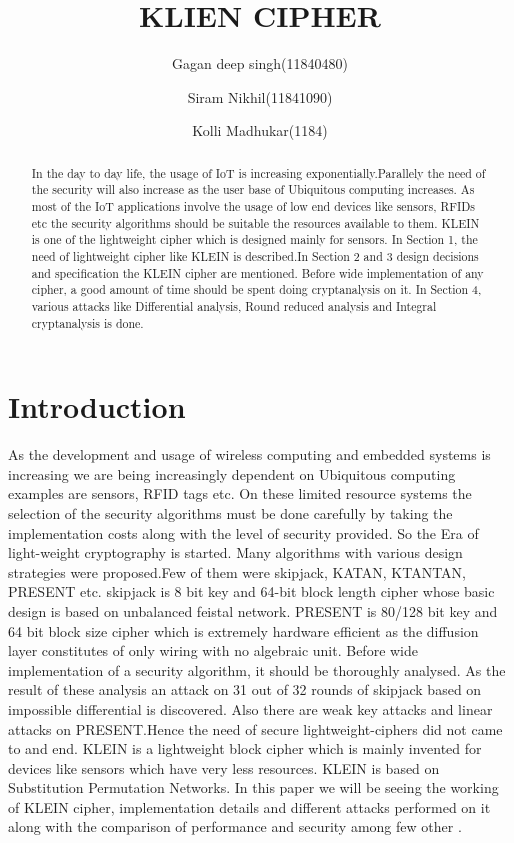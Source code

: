 \documentclass[preprint]{transcrypto}
\author{Gagan deep singh(11840480)\inst{1} \and Siram Nikhil\inst{1}(11841090) \and Kolli Madhukar(1184)\inst{1}}
\institute{
 Indian Institute of Technology, Bhilai, India 
}
\title{KLIEN CIPHER}
\begin{document}
\maketitle


\begin{abstract}
In the day to day life, the usage of IoT is increasing exponentially.Parallely the need of the security will also increase as the user base of Ubiquitous computing increases. As most of the IoT applications involve the usage of low end devices like sensors, RFIDs etc the security algorithms should be suitable the resources available to them. KLEIN is one of the lightweight cipher which is designed mainly for sensors. In Section 1, the need of lightweight cipher like KLEIN is described.In Section 2 and 3 design decisions and specification the KLEIN cipher are mentioned. Before wide implementation of any cipher, a good amount of time should be spent doing cryptanalysis on it. In Section 4, various attacks like Differential analysis, Round reduced analysis and Integral cryptanalysis is done.
\end{abstract}


\section{Introduction}
As the development and usage of wireless computing and embedded systems is increasing we are being increasingly dependent on Ubiquitous computing examples are sensors, RFID tags etc. On these limited resource systems the selection of the security algorithms must be done carefully by taking the implementation costs along with the level of security provided. So the Era of light-weight cryptography is started. Many algorithms with various design strategies were proposed.Few of them were skipjack, KATAN\cite{KATAN}, KTANTAN\cite{KATAN}, PRESENT\cite{PRESENT} etc. skipjack is 8 bit key and 64-bit block length cipher whose basic design is based on unbalanced feistal network. PRESENT is 80/128 bit key and 64 bit block size cipher  which is extremely hardware efficient as the diffusion layer constitutes of only wiring with no algebraic unit.
Before wide implementation of a security algorithm, it should be thoroughly analysed. As the result of these analysis an attack on 31 out of 32 rounds of skipjack based on impossible differential is discovered. Also there are weak key attacks and linear attacks on PRESENT.Hence the need of secure lightweight-ciphers did not came to and end. KLEIN is a lightweight block cipher which is mainly invented for devices like sensors which have very less resources. KLEIN \cite{KLEIN} is based on Substitution Permutation Networks. In this paper we will be seeing the working of KLEIN cipher, implementation details and different attacks performed on it along with the comparison of performance and security among few other .
\end{document}
